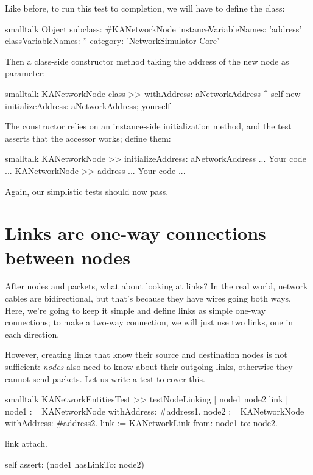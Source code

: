 \documentclass[10pt,twoside,english]{_support/latex/sbabook/sbabook}
\begin{document}
Like before, to run this test to completion, we will have to define the  class:

\begin{displaycode}{smalltalk}
Object subclass: #KANetworkNode
    instanceVariableNames: 'address'
    classVariableNames: ''
    category: 'NetworkSimulator-Core'
\end{displaycode}

Then a class-side constructor method taking the address of the new node as parameter:

\begin{displaycode}{smalltalk}
KANetworkNode class >> withAddress: aNetworkAddress
    ^ self new
        initializeAddress: aNetworkAddress;
        yourself
\end{displaycode}

The constructor relies on an instance-side initialization method, and the test asserts that the  accessor works; define them:

\begin{displaycode}{smalltalk}
KANetworkNode >> initializeAddress: aNetworkAddress
	... Your code ...
KANetworkNode >> address
	... Your code ...
\end{displaycode}

Again, our simplistic tests should now pass.
\section{Links are one-way connections between nodes}
After nodes and packets, what about looking at links?
In the real world, network cables are bidirectional, but that's because they have wires going both ways.
Here, we're going to keep it simple and define links as simple one-way connections; to make a two-way connection, we will just use two links, one in each direction.

However, creating links that know their source and destination nodes is not sufficient: \textit{nodes} also need to know about their outgoing links, otherwise they cannot send packets. Let us write a test to cover this.

\begin{displaycode}{smalltalk}
KANetworkEntitiesTest >> testNodeLinking
    | node1 node2 link |
    node1 := KANetworkNode withAddress: #address1.
    node2 := KANetworkNode withAddress: #address2.
    link := KANetworkLink from: node1 to: node2.

    link attach.

    self assert: (node1 hasLinkTo: node2)
\end{displaycode}
\end{document}
